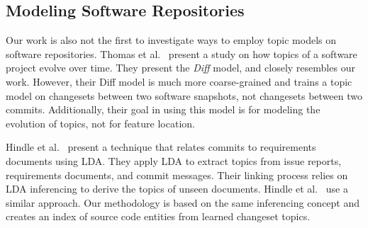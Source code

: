 \subsection{Modeling Software Repositories}

Our work is also not the first to investigate ways to employ topic models on
software repositories. Thomas et al.~\cite{Thomas-etal_2011} present a study on
how topics of a software project evolve over time. They present the \emph{Diff}
model, and closely resembles our work. However, their Diff model is much more
coarse-grained and trains a topic model on changesets between two software
snapshots, not changesets between two commits. Additionally, their goal in using
this model is for modeling the evolution of topics, not for feature location.

Hindle et al.~\cite{Hindle-etal_2009} present a technique that relates commits
to requirements documents using LDA. They apply LDA to extract topics from issue
reports, requirements documents, and commit messages. Their linking process
relies on LDA inferencing to derive the topics of unseen documents. Hindle et
al.~\cite{Hindle-etal_2014} use a similar approach. Our methodology is based on
the same inferencing concept and creates an index of source code entities from
learned changeset topics.
